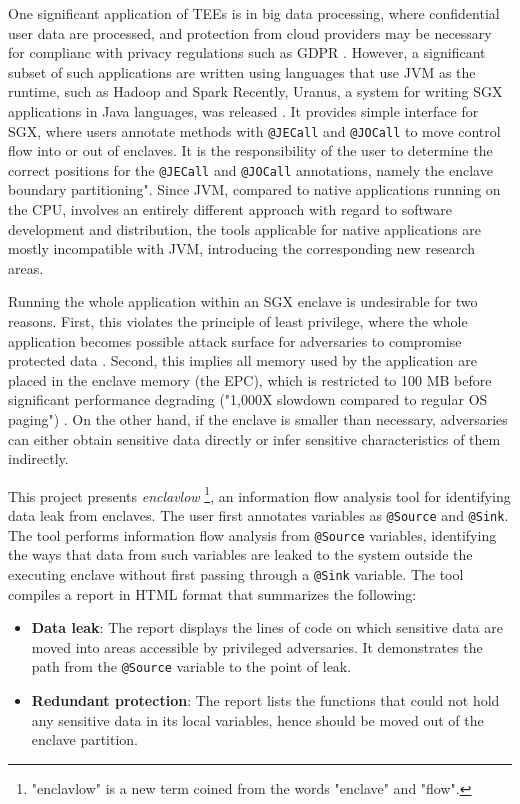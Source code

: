 \documentclass[a4paper, 12pt]{article}
\def\pname{\emph{enclavlow}}
\def\code#1{\colorbox{code}{\texttt{\footnotesize #1}}}
\begin{document}
One significant application of TEEs is in big data processing,
where confidential user data are processed,
and protection from cloud providers may be necessary
for complianc with privacy regulations such as GDPR \cite{gdpr}.
However, a significant subset of such applications are written
using languages that use JVM as the runtime,
such as Hadoop \cite{apachehadoop} and Spark \cite{apachespark}
Recently, Uranus, a system for
writing SGX applications in Java languages, was released \cite{uranus}.
It provides simple interface for SGX,
where users annotate methods with \code{@JECall} and \code{@JOCall}
to move control flow into or out of enclaves.
It is the responsibility of the user to determine the correct positions
for the \code{@JECall} and \code{@JOCall} annotations,
namely the enclave boundary partitioning".
Since JVM, compared to native applications running on the CPU,
involves an entirely different approach
with regard to software development and distribution,
the tools applicable for native applications are mostly incompatible with JVM,
introducing the corresponding new research areas.

Running the whole application within an SGX enclave is undesirable for two reasons.
First, this violates the principle of least privilege,
where the whole application becomes possible attack surface
for adversaries to compromise protected data \cite{glamdring}.
Second, this implies all memory used by the application
are placed in the enclave memory (the EPC),
which is restricted to 100 MB before significant performance degrading
("1,000X slowdown compared to regular OS paging") \cite{uranus}.
On the other hand, if the enclave is smaller than necessary,
adversaries can either obtain sensitive data directly or
infer sensitive characteristics of them indirectly.

This project presents \pname{}
\footnote{"enclavlow" is a new term coined from the words "enclave" and "flow".},
an information flow analysis tool
for identifying data leak from enclaves.
The user first annotates variables as \code{@Source} and \code{@Sink}.
The tool performs information flow analysis from \code{@Source} variables,
identifying the ways that data from such variables are leaked
to the system outside the executing enclave
without first passing through a \code{@Sink} variable.
The tool compiles a report in HTML format that summarizes the following:
\begin{itemize}
	\item \textbf{Data leak}:
		The report displays the lines of code on which sensitive data are moved
		into areas accessible by privileged adversaries.
		It demonstrates the path from the \code{@Source} variable to the point of leak.
	\item \textbf{Redundant protection}:
		The report lists the functions that could not hold any sensitive data in its local variables,
		hence should be moved out of the enclave partition.
\end{itemize}
\end{document}
